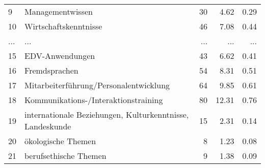\begin{longtable}{lXrrr}
        9 & \multicolumn{1}{X}{Managementwissen} & %
          \num{30} &
          \num[round-mode=places,round-precision=2]{4.62} &
          \num[round-mode=places,round-precision=2]{0.29} \\
        10 & \multicolumn{1}{X}{Wirtschaftskenntnisse} & %
          \num{46} &
          \num[round-mode=places,round-precision=2]{7.08} &
          \num[round-mode=places,round-precision=2]{0.44} \\
       ... & ... & ... & ... & ... \\
        15 & \multicolumn{1}{X}{EDV-Anwendungen} & %
          \num{43} &
          \num[round-mode=places,round-precision=2]{6.62} &
          \num[round-mode=places,round-precision=2]{0.41} \\

        16 & \multicolumn{1}{X}{Fremdsprachen} & %
          \num{54} &
          \num[round-mode=places,round-precision=2]{8.31} &
          \num[round-mode=places,round-precision=2]{0.51} \\

        17 & \multicolumn{1}{X}{Mitarbeiterführung/Personalentwicklung} & %
          \num{64} &
          \num[round-mode=places,round-precision=2]{9.85} &
          \num[round-mode=places,round-precision=2]{0.61} \\

        18 & \multicolumn{1}{X}{Kommunikations-/Interaktionstraining} & %
          \num{80} &
          \num[round-mode=places,round-precision=2]{12.31} &
          \num[round-mode=places,round-precision=2]{0.76} \\

        19 & \multicolumn{1}{X}{internationale Beziehungen, Kulturkenntnisse, Landeskunde} & %
          \num{15} &
          \num[round-mode=places,round-precision=2]{2.31} &
          \num[round-mode=places,round-precision=2]{0.14} \\

        20 & \multicolumn{1}{X}{ökologische Themen} & %
          \num{8} &
          \num[round-mode=places,round-precision=2]{1.23} &
          \num[round-mode=places,round-precision=2]{0.08} \\

        21 & \multicolumn{1}{X}{berufsethische Themen} & %
          \num{9} &
          \num[round-mode=places,round-precision=2]{1.38} &
          \num[round-mode=places,round-precision=2]{0.09} \\


\end{longtable}
